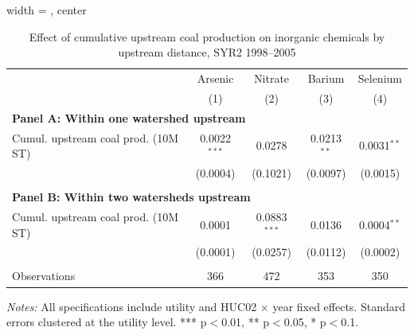 \begin{table}[htbp]
   
   \caption{\label{tab:6yr_huc02fe_inorg_ravalli_2005_k2} Effect of cumulative upstream coal production on inorganic chemicals by upstream distance, SYR2 1998--2005}
   \bigskip
   
   \centering
   
\begin{adjustbox}{width = \textwidth, center}
   \begin{tabular}{lcccc}
      \toprule
       & Arsenic & Nitrate & Barium & Selenium \\
                                          & (1)            & (2)      & (3)           & (4)\\  
      \midrule 
      \multicolumn{5}{l}{\textbf{Panel A: Within one watershed upstream}} \\
      Cumul. upstream coal prod. (10M ST) & 0.0022$^{***}$ & 0.0278   & 0.0213$^{**}$ & 0.0031$^{**}$\\   
                                          & (0.0004)       & (0.1021) & (0.0097)      & (0.0015)\\   
       \\
      \midrule 
      \multicolumn{5}{l}{\textbf{Panel B: Within two watersheds upstream}} \\
      Cumul. upstream coal prod. (10M ST) & 0.0001   & 0.0883$^{***}$ & 0.0136   & 0.0004$^{**}$\\   
                                          & (0.0001) & (0.0257)       & (0.0112) & (0.0002)\\   
       \\
      Observations                        & 366      & 472            & 353      & 350\\  
      \bottomrule
   \end{tabular}
\end{adjustbox}
   
   {\tiny\linespread{1}\selectfont \par \raggedright 
   \textit{Notes:} All specifications include utility and HUC02 $\times$ year fixed effects. Standard errors clustered at the utility level. *** p$<$0.01, ** p$<$0.05, * p$<$0.1.}
   
\end{table}


